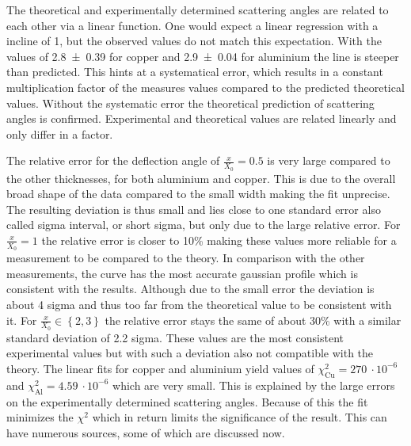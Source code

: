 \documentclass[sn-mathphys-num,iicol]{sn-jnl}
\theoremstyle{thmstyleone}
\theoremstyle{thmstyletwo}
\theoremstyle{thmstylethree}
\begin{document}
The theoretical and experimentally determined scattering angles are related to each other via a linear function.
One would expect a linear regression with a incline of 1, but the observed values do not match this expectation.
With the values of \SI{2.8\pm0.39}{} for copper and \SI{2.9\pm0.04}{} for aluminium the line is steeper than predicted.
This hints at a systematical error, which results in a constant multiplication factor of the measures values compared to the predicted theoretical values.
Without the systematic error the theoretical prediction of scattering angles is confirmed.
Experimental and theoretical values are related linearly and only differ in a factor.

The relative error for the deflection angle of $\tfrac{x}{X_0}=0.5$ is very large compared to the other thicknesses, for both aluminium and copper.
This is due to the overall broad shape of the data compared to the small width making the fit unprecise.
The resulting deviation is thus small and lies close to one standard error also called sigma interval, or short sigma, but only due to the large relative error.
For $\tfrac{x}{X_0}=1$ the relative error is closer to 10\% making these values more reliable for a measurement to be compared to the theory.
In comparison with the other measurements, the curve has the most accurate gaussian profile which is consistent with the results.
Although due to the small error the deviation is about 4 sigma and thus too far from the theoretical value to be consistent with it.
For $\tfrac{x}{X_0} \in \left\{2,3\right\}$ the relative error stays the same of about 30\% with a similar standard deviation of 2.2 sigma.
These values are the most consistent experimental values but with such a deviation also not compatible with the theory.
The linear fits for copper and aluminium yield values of $\chi ^2_\text{Cu}=\SI{270}{}\cdot10^{-6}$ and $\chi ^2_\text{Al}=\SI{4.59}{}\cdot10^{-6}$ which are very small.
This is explained by the large errors on the experimentally determined scattering angles.
Because of this the fit minimizes the $\chi^2$ which in return limits the significance of the result.
This can have numerous sources, some of which are discussed now.
\end{document}
